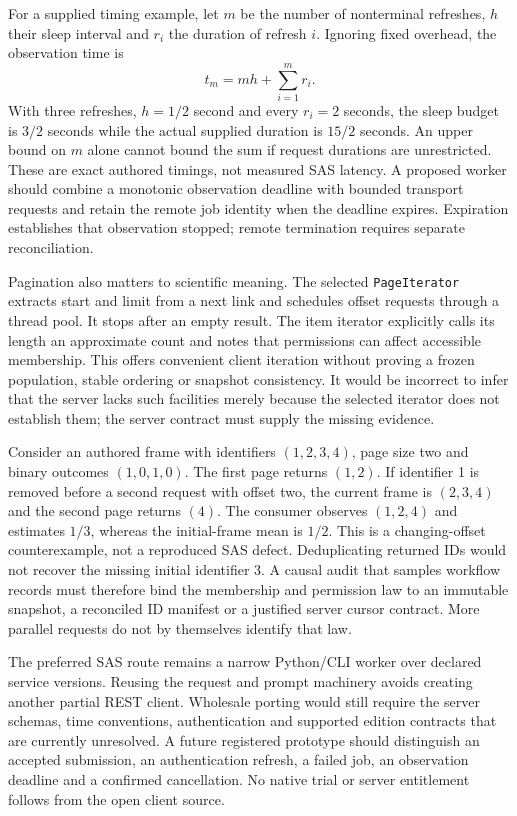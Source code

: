 For a supplied timing example, let $m$ be the number of nonterminal
refreshes, $h$ their sleep interval and $r_i$ the duration of refresh $i$.
Ignoring fixed overhead, the observation time is
\begin{equation}
 t_m=mh+\sum_{i=1}^{m}r_i.
 \label{eq:exec23-delegate-time}
\end{equation}
With three refreshes, $h=1/2$ second and every $r_i=2$ seconds, the sleep
budget is $3/2$ seconds while the actual supplied duration is $15/2$
seconds. An upper bound on $m$ alone cannot bound the sum if request
durations are unrestricted. These are exact authored timings, not measured
SAS latency. A proposed worker should combine a monotonic observation
deadline with bounded transport requests and retain the remote job identity
when the deadline expires. Expiration establishes that observation stopped;
remote termination requires separate reconciliation.
\citep{exec23_workflow_delegates_reference}

Pagination also matters to scientific meaning. The selected
\texttt{PageIterator} extracts start and limit from a next link and schedules
offset requests through a thread pool. It stops after an empty result. The
item iterator explicitly calls its length an approximate count and notes
that permissions can affect accessible membership. This offers convenient
client iteration without proving a frozen population, stable ordering or
snapshot consistency. It would be incorrect to infer that the server lacks
such facilities merely because the selected iterator does not establish
them; the server contract must supply the missing evidence.
\citep{exec23_workflow_delegates_sasctl}

Consider an authored frame with identifiers $(1,2,3,4)$, page size two and
binary outcomes $(1,0,1,0)$. The first page returns $(1,2)$. If identifier 1
is removed before a second request with offset two, the current frame is
$(2,3,4)$ and the second page returns $(4)$. The consumer observes
$(1,2,4)$ and estimates $1/3$, whereas the initial-frame mean is $1/2$.
This is a changing-offset counterexample, not a reproduced SAS defect.
Deduplicating returned IDs would not recover the missing initial identifier
3. A causal audit that samples workflow records must therefore bind the
membership and permission law to an immutable snapshot, a reconciled ID
manifest or a justified server cursor contract. More parallel requests do
not by themselves identify that law.
\citep{exec23_workflow_delegates_reference}

The preferred SAS route remains a narrow Python/CLI worker over declared
service versions. Reusing the request and prompt machinery avoids creating
another partial REST client. Wholesale porting would still require the
server schemas, time conventions, authentication and supported edition
contracts that are currently unresolved. A future registered prototype
should distinguish an accepted submission, an authentication refresh, a
failed job, an observation deadline and a confirmed cancellation. No native
trial or server entitlement follows from the open client source.

